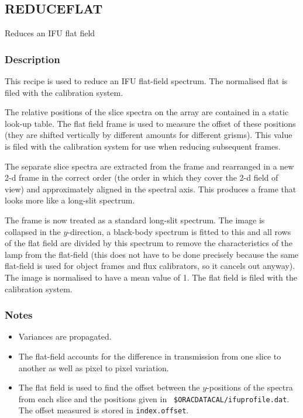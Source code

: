 \documentclass[twoside,11pt]{article}
\renewcommand{\_}{\texttt{\symbol{95}}}
\begin{document}
\clearpage


\subsection{REDUCE\_FLAT}

Reduces an IFU flat field

\subsubsection*{Description}

This recipe is used to reduce an IFU flat-field spectrum. The
normalised flat is filed with the calibration system.

The relative positions of the slice spectra on the array are contained
in a static look-up table. The flat field frame is used to measure the
offset of these positions (they are shifted vertically by different
amounts for different grisms). This value is filed with the calibration
system for use when reducing subsequent frames.

The separate slice spectra are extracted from the frame and rearranged
in a new 2-d frame in the correct order (the order in which they cover
the 2-d field of view) and approximately aligned in the spectral axis. This 
produces a frame that looks more like a long-slit spectrum.

The frame is now treated as a standard long-slit spectrum. The image
is collapsed in the $y$-direction, a black-body spectrum is fitted to
this and all rows of the flat field are divided by this spectrum to
remove the characteristics of the lamp from the flat-field (this does
not have to be done precisely because the same flat-field is used for
object frames and flux calibrators, so it cancels out anyway). The
image is normalised to have a mean value of 1.  The flat field is
filed with the calibration system.




\subsubsection*{Notes}
\begin{itemize}

\item

Variances are propagated.

\item

The flat-field accounts for the difference in transmission from one
slice to another as well as pixel to pixel variation.

\item
  
  The flat field is used to find the offset between the $y$-positions
  of the spectra from each slice and the positions given in {\tt
    \$ORAC\_DATA\_CAL/ifu\_profile.dat}. The offset measured is stored
  in {\tt index.offset}.

\end{itemize}
\end{document}
